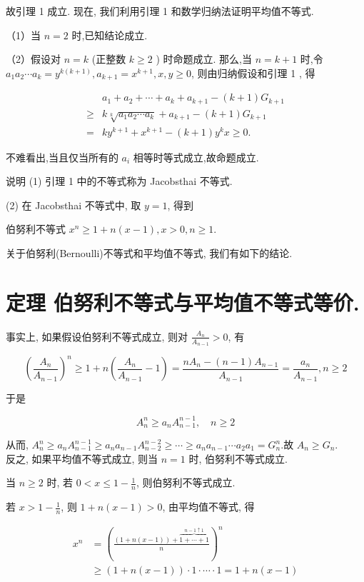 故引理 1 成立. 现在, 我们利用引理 1 和数学归纳法证明平均值不等式.

（1）当 $n=2$ 时,已知结论成立.

（2）假设对 $n=k$ (正整数 $k \geqslant 2$ ) 时命题成立. 那么,当 $n=k+1$ 时,令 $a_{1} a_{2} \cdots a_{k}=y^{k(k+1)}, a_{k+1}=x^{k+1}, x, y \geqslant 0$, 则由归纳假设和引理 1 , 得

$$
\begin{aligned}
& a_{1}+a_{2}+\cdots+a_{k}+a_{k+1}-(k+1) G_{k+1} \\
\geqslant & k \sqrt[k]{a_{1} a_{2} \cdots a_{k}}+a_{k+1}-(k+1) G_{k+1} \\
= & k y^{k+1}+x^{k+1}-(k+1) y^{k} x \geqslant 0 .
\end{aligned}
$$

不难看出,当且仅当所有的 $a_{i}$ 相等时等式成立,故命题成立.

说明 (1) 引理 1 中的不等式称为 Jacobsthai 不等式.

(2) 在 Jacobsthai 不等式中, 取 $y=1$, 得到

伯努利不等式 $x^{n} \geqslant 1+n(x-1), x>0, n \geqslant 1$.

关于伯努利(Bernoulli)不等式和平均值不等式, 我们有如下的结论.

\section*{定理 伯努利不等式与平均值不等式等价.}
事实上, 如果假设伯努利不等式成立, 则对 $\frac{A_{n}}{A_{n-1}}>0$, 有

$$
\left(\frac{A_{n}}{A_{n-1}}\right)^{n} \geqslant 1+n\left(\frac{A_{n}}{A_{n-1}}-1\right)=\frac{n A_{n}-(n-1) A_{n-1}}{A_{n-1}}=\frac{a_{n}}{A_{n-1}}, n \geqslant 2
$$

于是

$$
A_{n}^{n} \geqslant a_{n} A_{n-1}^{n-1}, \quad n \geqslant 2
$$

从而, $A_{n}^{n} \geqslant a_{n} A_{n-1}^{n-1} \geqslant a_{n} a_{n-1} A_{n-2}^{n-2} \geqslant \cdots \geqslant a_{n} a_{n-1} \cdots a_{2} a_{1}=G_{n}^{n}$.故 $A_{n} \geqslant G_{n}$.\\
反之, 如果平均值不等式成立, 则当 $n=1$ 时, 伯努利不等式成立.

当 $n \geqslant 2$ 时, 若 $0<x \leqslant 1-\frac{1}{n}$, 则伯努利不等式成立.

若 $x>1-\frac{1}{n}$, 则 $1+n(x-1)>0$, 由平均值不等式, 得

$$
\begin{aligned}
x^{n} & =(\frac{(1+n(x-1))+\overbrace{1+\cdots+1}^{n-1 \uparrow 1}}{n})^{n} \\
& \geqslant(1+n(x-1)) \cdot 1 \cdot \cdots \cdot 1=1+n(x-1)
\end{aligned}
$$

